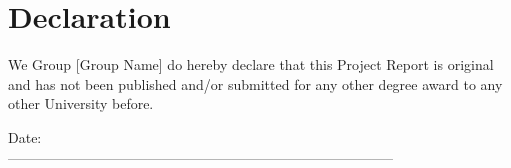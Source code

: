 \cleardoublepage
{}
\chapter*{Declaration}
We Group [Group Name] do hereby declare that this Project Report is original and has not been published and/or submitted for any other degree award to any other University before.


\begin{table}[!ht]
\centering
{}
\end{table}
\vspace{1.0in}
\noindent
Date: \\
-----------------------------------------------------------------------------------
\newpage

